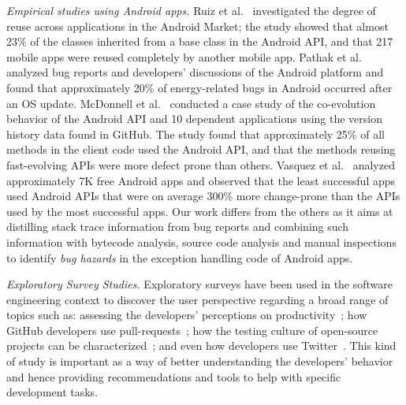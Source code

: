 {\textit{Empirical studies using Android apps.} Ruiz et al.~\cite{Ruiz12}
investigated the degree of reuse across applications in the Android Market; the
study showed that almost 23\% of the classes inherited from a base class in the
Android API, and that 217 mobile apps were reused completely by another mobile
app. Pathak et al.~\cite{Patha11} analyzed bug reports and developers'
discussions of the Android platform and found that approximately 20\% of
energy-related bugs in Android occurred after an OS update. McDonnell et
al.~\cite{McDon13} conducted a case study of the co-evolution behavior of
the Android API and 10 dependent applications using the version history data found
in GitHub. The study found that approximately 25\% of all methods in the client
code used the Android API, and that the methods reusing fast-evolving APIs were
more defect prone than others. Vasquez et al.~\cite{Linar13} analyzed
approximately 7K free Android apps and observed that the least successful apps
used Android APIs that were on average 300\% more change-prone than the APIs
used by the most successful apps. Our work differs from the others as it aims at
distilling stack trace information from bug reports and combining such information
with bytecode analysis, source code analysis and manual inspections
to identify \emph{bug hazards} in the exception handling code of Android apps.

\textit{Exploratory Survey Studies.} Exploratory surveys have been used in the software
engineering context to discover the user perspective regarding a broad range of
topics such as: assessing the developers' perceptions on productivity~\cite{meyer2014};
how GitHub developers use pull-requests~\cite{gousios2015};
how the testing culture of open-source projects can be characterized~\cite{pham2013};
and even how developers use Twitter~\cite{singer2014}. This kind of study is important as a way of
better understanding the developers' behavior and hence providing recommendations and
tools to help with specific development tasks.

}

